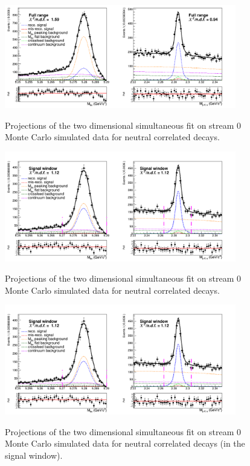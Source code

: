 \begin{figure}[H]
\centering
{\includegraphics[width=0.90\textwidth]{04-SimultaneousFit/figs/neutral_corrSample_simultaneous2DFit_stream0.png}}
\caption{Projections of the two dimensional simultaneous fit on stream 0 Monte Carlo simulated data for neutral correlated decays.}
\label{fig:neutral_corrSample_simultaneous2DFit_stream0}
\end{figure}

\begin{figure}[H]
    \centering
    {\includegraphics[width=0.90\textwidth]{04-SimultaneousFit/figs/neutral_corrSignal_window_Total_2DFit_stream0.png}}
    \caption{Projections of the two dimensional simultaneous fit on stream 0 Monte Carlo simulated data for neutral correlated decays.}
    \label{fig:neutral_corrSignal_window_Total_2DFit_stream0}
    \end{figure}



    
    \begin{figure}[H]
        \centering
        {\includegraphics[width=0.90\textwidth]{04-SimultaneousFit/figs/neutral_corrSignal_window_Total_2DFit_stream0.png}}
        \caption{Projections of the two dimensional simultaneous fit on stream 0 Monte Carlo simulated data for neutral correlated decays (in the signal window).}
        \label{fig:neutral_corrSignal_window_Total_2DFit_stream0}
        \end{figure}

